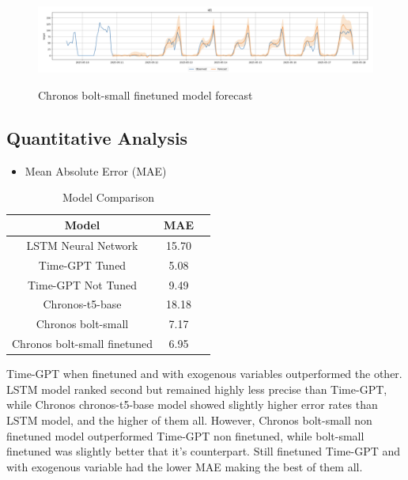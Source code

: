 \documentclass{article}
\begin{document}
\begin{figure}[h]
\includegraphics[width=1\linewidth]{images/chronos-finetuned.png}
    \label{fig:mesh1}
    \caption{Chronos bolt-small finetuned model forecast}
\end{figure}

\subsection{Quantitative Analysis}
\begin{itemize}
    \item Mean Absolute Error (MAE)
\end{itemize}

\begin{table}[h]
\centering
\begin{tabular}{|c|c|c|}
\hline  
\textbf{Model} & \textbf{MAE} \\
\hline
LSTM Neural Network  & 15.70 \\

Time-GPT Tuned  & 5.08 \\

Time-GPT Not Tuned &  9.49 \\

Chronos-t5-base  & 18.18 \\

Chronos bolt-small  & 7.17 \\

Chronos bolt-small finetuned  & 6.95 \\
\hline

\end{tabular}
\caption{Model Comparison}
\label{tab:example}
\end{table}

Time-GPT when finetuned and with exogenous variables outperformed the other. LSTM model ranked second but remained highly less precise than Time-GPT, while Chronos chronos-t5-base model showed slightly higher error rates than LSTM model, and the higher of them all. However, Chronos bolt-small non finetuned model outperformed Time-GPT non finetuned, while bolt-small finetuned was slightly better that it's counterpart. Still finetuned Time-GPT and with exogenous variable had the lower MAE making the best of them all. 
\end{document}

